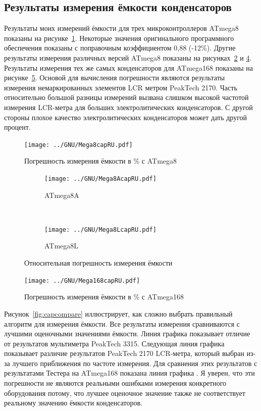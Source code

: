 \subsection{Результаты измерения ёмкости конденсаторов}
Результаты моих измерений ёмкости для трех микроконтроллеров ATmega8 показаны на рисунке~\ref{fig:mega8cap}. Некоторые 
значения оригинального программного обеспечения показаны с поправочным коэффициентом 0,88 (-12\%).
Другие результаты измерения различных версий ATmega8 показаны на рисунках~\ref{fig:mega8Acap} и \ref{fig:mega8Lcap}.
Результаты измерения тех же самых конденсаторов для ATmega168 показаны на рисунке~\ref{fig:mega168cap}.
Основой для вычисления погрешности являются результаты измерения немаркированных элементов LCR метром PeakTech 2170. 
Часть относительно большой разницы измерений вызвана слишком высокой частотой измерения LCR-метра для больших 
электролитических конденсаторов. С другой стороны плохое качество электролитических конденсаторов может дать другой 
процент.

\begin{figure}[H]
\centering
\texttt{[image: ../GNU/Mega8capRU.pdf]}
\caption{Погрешность измерения ёмкости в \% с ATmega8 }
\label{fig:mega8cap}
\end{figure}

\begin{figure}[H]
  \begin{subfigure}[b]{.5\textwidth}
    \centering
    \texttt{[image: ../GNU/Mega8AcapRU.pdf]}
    \caption{ATmega8A}
    \label{fig:mega8Acap}
  \end{subfigure}
  ~
  \begin{subfigure}[b]{.5\textwidth}
    \centering
    \texttt{[image: ../GNU/Mega8LcapRU.pdf]}
    \caption{ATmega8L}
    \label{fig:mega8Lcap}
  \end{subfigure}
  \caption{Относительная погрешность измерения ёмкости}
\end{figure}

\begin{figure}[H]
\centering
\texttt{[image: ../GNU/Mega168capRU.pdf]}
\caption{Погрешность измерения ёмкости в \% с ATmega168 }
\label{fig:mega168cap}
\end{figure}

Рисунок~\ref{fig:capcompare} иллюстрирует, как сложно выбрать правильный алгоритм для измерения ёмкости. Все 
результаты измерения сравниваются с лучшими оценочными значениями ёмкости. Линия графика  показывает 
отличие от результатов мультиметра PeakTech 3315. Следующая линия графика  показывает различие результатов 
PeakTech 2170 LCR-метра, который выбран из-за лучшего приближения по частоте измерения. Для сравнения этих 
результатов с результатами Тестера на ATmega168 показана линия графика . Я уверен, что эти погрешности 
не являются реальными ошибками измерения конкретного оборудования потому, что лучшее оценочное значение также не 
соответствует реальному значению ёмкости конденсаторов.

